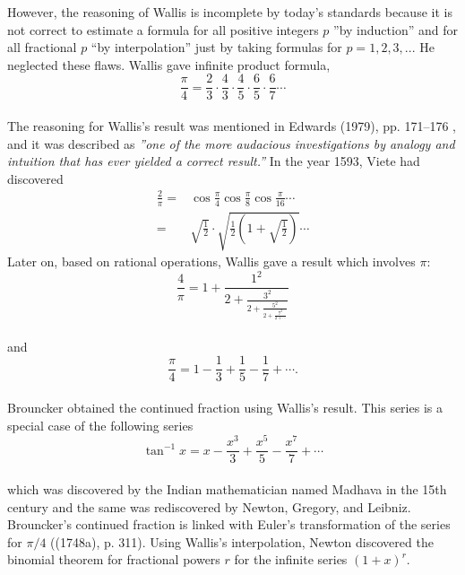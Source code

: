 \documentclass[a4paper,reqno,11pt]{amsart}
\theoremstyle{plain}%
\begin{document}
However, the reasoning
of Wallis is incomplete by today’s standards because it is not correct to estimate a formula for all positive integers $p$ ''by induction” and for all fractional $p$ ``by interpolation” just by taking formulas for $p=1,2,3,...$ He neglected these flaws. Wallis gave infinite product formula,
$$\frac{\pi}{4} = \frac{2}{3}\cdot\frac{4}{3}\cdot\frac{4}{5}\cdot\frac{6}{5}\cdot\frac{6}{7}\cdots$$
\\
The reasoning for Wallis's result was mentioned in Edwards (1979), pp. 171–176 \cite{ref 4}, and it was described as \textit{''one of the more audacious investigations by analogy and intuition that has ever yielded a correct result.”}
In the year 1593, Viete had discovered
\begin{eqnarray*}
\frac{2}{\pi} =& \cos\frac{\pi}{4}\cos\frac{\pi}{8}\cos\frac{\pi}{16}\cdots\\
=& \sqrt{\frac{1}{2}}\cdot\sqrt{\frac{1}{2}\left(1+\sqrt{\frac{1}{2}}\right)}\cdots
\end{eqnarray*}
Later on, based on rational operations, Wallis gave a result which involves $\pi$:\\
$$\frac{4}{\pi} = 1 + \frac{1^2}{2 + \frac{3^2}{2 + \frac{5^2}{2 + \frac{7^2}{2 + \cdots}}}}$$
\\
and 
$$\frac{\pi}{4} = 1 - \frac{1}{3} + \frac{1}{5} - \frac{1}{7} + \cdots.$$
\\
Brouncker obtained the continued fraction using Wallis’s result. This series is a special case of the following series
$$\tan^{-1}x = x - \frac{x^3}{3} + \frac{x^5}{5} - \frac{x^7}{7} + \cdots$$
\\
which was discovered by the Indian mathematician named Madhava in the 15th century and the same was rediscovered by Newton, Gregory, and Leibniz.
Brouncker’s continued fraction is linked with Euler's transformation of the series for $\pi/4$ ((1748a), p. 311). Using Wallis’s interpolation, Newton discovered the binomial theorem for fractional powers $r$ for the infinite series $(1+x)^r.$
\\
\end{document}

